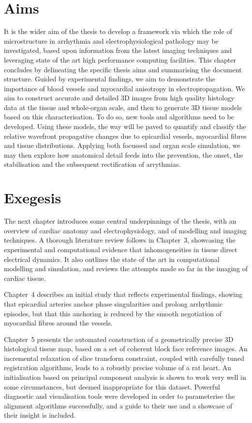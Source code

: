 \section{Aims}
\label{sec:intro:aims}
  It is the wider aim of the thesis to develop a framework via which the role of microstructure in arrhythmia and electrophysiological pathology may be investigated, based upon information from the latest imaging techniques and leveraging state of the art high performance computing facilities. This chapter concludes by delineating the specific thesis aims and summarising the document structure. Guided by experimental findings, we aim to demonstrate the importance of blood vessels and myocardial anisotropy in electropropagation. We aim to construct accurate and detailed 3D images from high quality histology data at the tissue and whole-organ scale, and then to generate 3D tissue models based on this characterisation. To do so, new tools and algorithms need to be developed. Using these models, the way will be paved to quantify and classify the relative wavefront propagative changes due to epicardial vessels, myocardial fibres and tissue distributions. Applying both focussed and organ scale simulation, we may then explore how anatomical detail feeds into the prevention, the onset, the stabilisation and the subsequent rectification of arrythmias.

\section{Exegesis}
\label{sec:intro:exegesis}
  The next chapter introduces some central underpinnings of the thesis, with an overview of cardiac anatomy and electrophysiology, and of modelling and imaging techniques. A thorough literature review follows in Chapter~3, showcasing the experimental and computational evidence that inhomogeneities in tissue direct electrical dynamics. It also outlines the state of the art in computational modelling and simulation, and reviews the attempts made so far in the imaging of cardiac tissue.
  
  Chapter~4 describes an initial study that reflects experimental findings, showing that epicardial arteries anchor phase singularities and prolong arrhythmic episodes, but that this anchoring is reduced by the smooth negotiation of myocardial fibres around the vessels.
  
  Chapter~5 presents the automated construction of a geometrically precise 3D histological tissue map, based on a set of coherent block face reference images. An incremental relaxation of slice transform constraint, coupled with carefully tuned registration algorithms, leads to a robustly precise volume of a rat heart. An initialisation based on principal component analysis is shown to work very well in some circumstances, but deemed inappropriate for this dataset. Powerful diagnostic and visualisation tools were developed in order to parameterise the alignment algorithms successfully, and a guide to their use and a showcase of their insight is included.
  
